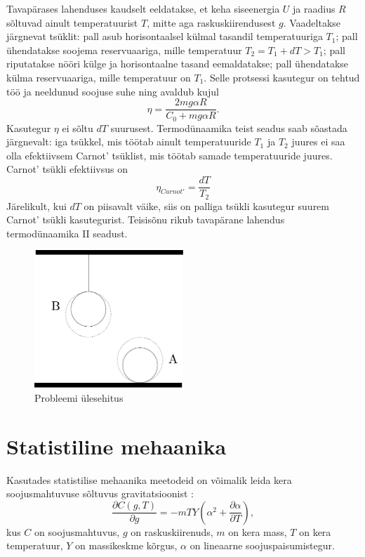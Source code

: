 \documentclass{trkut}%
\begin{document}
Tavapärases lahenduses kaudselt eeldatakse, et keha siseenergia \(U\) ja raadius \(R\) sõltuvad ainult temperatuurist \(T\), mitte aga raskuskiirendusest \(g\). Vaadeltakse järgnevat tsüklit: pall asub horisontaalsel külmal tasandil temperatuuriga \(T_1\); pall ühendatakse soojema reservuaariga, mille temperatuur \(T_2=T_1+dT>T_1\); pall riputatakse nööri külge ja horisontaalne tasand eemaldatakse; pall ühendatakse külma reservuaariga, mille temperatuur on \(T_1\). Selle protsessi kasutegur on tehtud töö ja neeldunud soojuse suhe ning avaldub kujul \cite{palma15}
\begin{equation}
    \eta = \frac{2mg\alpha R}{C_0+mg\alpha R}.
\end{equation}
Kasutegur \(\eta\) ei sõltu \(dT\) suurusest. Termodünaamika teist seadus saab sõastada järgnevalt: iga tsükkel, mis töötab ainult temperatuuride \(T_1\) ja \(T_2\) juures ei saa olla efektiivsem Carnot' tsüklist, mis töötab samade temperatuuride juures. Carnot' tsükli efektiivsus on
\begin{equation}
    \eta_{Carnot'} = \frac{dT}{T_2}
\end{equation}
Järelikult, kui \(dT\) on piisavalt väike, siis on palliga tsükli kasutegur suurem Carnot' tsükli kasutegurist. Teisisõnu rikub tavapärane lahendus termodünaamika II seadust.
\begin{figure}[h]
    \includegraphics[width=0.5\textwidth]{joonis1.pdf}
    \caption{Probleemi ülesehitus}
    \label{iphojoonis}%
\end{figure}

\section{Statistiline mehaanika}

Kasutades statistilise mehaanika meetodeid on võimalik leida kera soojusmahtuvuse sõltuvus gravitatsioonist \parencite[test]{palma15}:
\begin{equation}
    \frac{\partial C(g,T)}{\partial g} = -mTY \left( \alpha^2 + \frac{\partial \alpha}{\partial T} \right),
\end{equation}
kus \(C\) on soojusmahtuvus, \(g\) on raskuskiirenuds, \(m\) on kera mass, \(T\) on kera temperatuur, \(Y\) on massikeskme kõrgus, \(\alpha\) on lineaarne soojuspaisumistegur.
\end{document}
